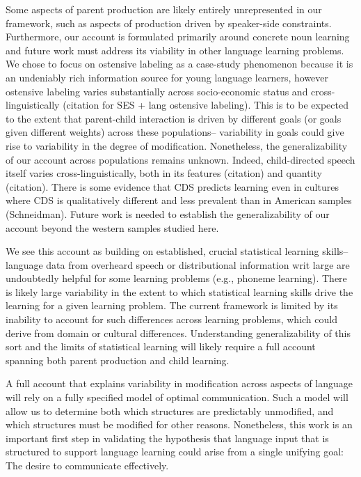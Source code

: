 \documentclass[english,,man,floatsintext]{apa6}
\begin{document}
Some aspects of parent production are likely entirely unrepresented in our framework, such as aspects of production driven by speaker-side constraints. Furthermore, our account is formulated primarily around concrete noun learning and future work must address its viability in other language learning problems. We chose to focus on ostensive labeling as a case-study phenomenon because it is an undeniably rich information source for young language learners, however ostensive labeling varies substantially across socio-economic status and cross-linguistically (citation for SES + lang ostensive labeling). This is to be expected to the extent that parent-child interaction is driven by different goals (or goals given different weights) across these populations-- variability in goals could give rise to variability in the degree of modification. Nonetheless, the generalizability of our account across populations remains unknown. Indeed, child-directed speech itself varies cross-linguistically, both in its features (citation) and quantity (citation). There is some evidence that CDS predicts learning even in cultures where CDS is qualitatively different and less prevalent than in American samples (Schneidman). Future work is needed to establish the generalizability of our account beyond the western samples studied here.

We see this account as building on established, crucial statistical learning skills-- language data from overheard speech or distributional information writ large are undoubtedly helpful for some learning problems (e.g., phoneme learning). There is likely large variability in the extent to which statistical learning skills drive the learning for a given learning problem. The current framework is limited by its inability to account for such differences across learning problems, which could derive from domain or cultural differences. Understanding generalizability of this sort and the limits of statistical learning will likely require a full account spanning both parent production and child learning.

A full account that explains variability in modification across aspects of language will rely on a fully specified model of optimal communication. Such a model will allow us to determine both which structures are predictably unmodified, and which structures must be modified for other reasons. Nonetheless, this work is an important first step in validating the hypothesis that language input that is structured to support language learning could arise from a single unifying goal: The desire to communicate effectively.
\end{document}
